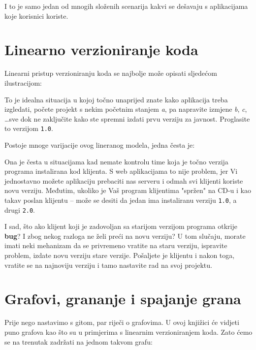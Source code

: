 I to je samo jedan od mnogih složenih scenarija kakvi se dešavaju s aplikacijama koje korisnici koriste.

\section*{Linearno verzioniranje koda}

Linearni pristup verzioniranju koda se najbolje može opisati sljedećom ilustracijom:



To je idealna situacija u kojoj točno unaprijed znate kako aplikacija treba izgledati, počete projekt s nekim početnim stanjem \emph{a}, pa napravite izmjene \emph{b}, \emph{c}, \dots sve dok ne zaključite kako ste spremni izdati prvu verziju za javnost.
Proglasite to verzijom \texttt{1.0}. 

Postoje mnoge varijacije ovog lineranog modela, jedna česta je:



Ona je česta u situacijama kad nemate kontrolu time koja je točno verzija programa instalirana kod klijenta. 
S web aplikacijama to nije problem, jer Vi jednostavno možete aplikaciju prebaciti nas serveru i odmah svi klijenti koriste novu verziju.
Međutim, ukoliko je Vaš program klijentima "spržen" na CD-u i kao takav poslan klijentu -- može se desiti da jedan ima instaliranu verziju \texttt{1.0}, a drugi \texttt{2.0}.

I sad, što ako klijent koji je zadovoljan sa starijom verzijom programa otkrije \textbf{bug}?
I zbog nekog razloga ne želi preći na novu verziju?
U tom slučaju, morate imati neki mehanizam da se privremeno vratite na staru verziju, ispravite problem, izdate novu verziju stare verzije. 
Pošaljete je klijentu i nakon toga, vratite se na najnoviju verziju i tamo nastavite rad na svoj projektu.

\section*{Grafovi, grananje i spajanje grana}

Prije nego nastavimo s gitom, par riječi o grafovima. 
U ovoj knjižici će vidjeti puno grafova kao što su u primjerima s linearnim verzioniranjem koda. 
Zato ćemo se na trenutak zadržati na jednom takvom grafu:

